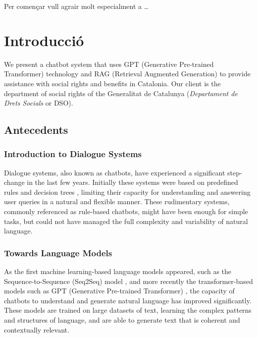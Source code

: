 \documentclass[a4paper,12pt,twoside]{ThesisStyle}
\begin{document}
Per començar vull agrair molt especialment a \ldots


\tableofcontents

\listoffigures

\listoftables

\mainmatter

\chapter{Introducció}
\label{cap:intro}

We present a chatbot system that uses GPT (Generative Pre-trained Transformer) technology and RAG (Retrieval Augmented Generation) to provide assistance with social rights and benefits in Catalonia. Our client is the department of social rights of the Generalitat de Catalunya (\textit{Departament de Drets Socials} or DSO).

\section{Antecedents}
\label{sec:antecedents}

\subsection{Introduction to Dialogue Systems}
\label{subsec:chat}

Dialogue systems, also known as chatbots, have experienced a significant step-change in the last few years. Initially these systems were based on predefined rules and decision trees \cite{Weizenbaum1966ELIZA, AbuShawar2015ALICE}, limiting their capacity for understanding and answering user queries in a natural and flexible manner. These rudimentary systems, commonly referenced as rule-based chatbots, might have been enough for simple tasks, but could not have managed the full complexity and variability of natural language.

\subsection{Towards Language Models}
\label{subsec:language}

As the first machine learning-based language models appeared, such as the Sequence-to-Sequence (Seq2Seq) model \cite{Sutskever2014SequenceSequenceLearningNeural}, and more recently the transformer-based models such as GPT (Generative Pre-trained Transformer) \cite{Vaswani2023AttentionNeed, Radford2018ImprovingLU}, the capacity of chatbots to understand and generate natural language has improved significantly. These models are trained on large datasets of text, learning the complex patterns and structures of language, and are able to generate text that is coherent and contextually relevant.
\end{document}
